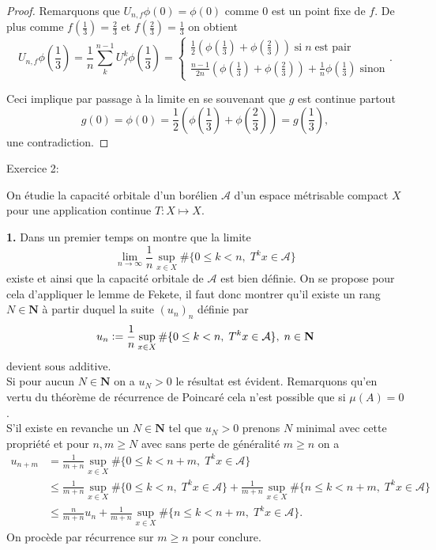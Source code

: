 \documentclass[12pt]{article}
\newcommand{\defeq}{\vcentcolon=}
\newenvironment{statement}[1]
{\begin{mdframed}[linewidth=0.6pt]
        Exercice \textsc{#1:}

}
    {\end{mdframed}}
\newcommand{\N}{\mathbf{N}}
\begin{document}
\begin{proof}
Remarquons que $U_{n,f}\phi(0) = \phi(0)$ comme 0 est un point fixe de $f$. De plus comme $f(\frac{1}{3}) = \frac{2}{3}$ et $f(\frac{2}{3}) = \frac{1}{3}$ on obtient \[
        U_{n, f}\phi(\frac{1}{3}) = \frac{1}{n}\sum_{k}^{n-1}U_{f}^{k}\phi(\frac{1}{3}) = \begin{cases}
                \frac{1}{2}(\phi(\frac{1}{3})+\phi(\frac{2}{3})) \; \text{si} \; n \; \text{est pair} \\
                \frac{n-1}{2n}(\phi(\frac{1}{3})+\phi(\frac{2}{3})) + \frac{1}{n}\phi(\frac{1}{3}) \; \text{sinon}
        \end{cases}
.\]  

Ceci implique par passage à la limite en se souvenant que $g$ est continue partout \[
        g(0) = \phi(0) = \frac{1}{2}(\phi(\frac{1}{3})+\phi(\frac{2}{3})) = g(\frac{1}{3}) 
,\] une contradiction.  

\end{proof}

\newpage

\begin{statement}{2}
       On étudie la capacité orbitale d'un borélien $\mathcal{A}$ d'un espace métrisable compact $X$ pour une application continue $T : X \longmapsto X$.
\end{statement}

\textbf{1.} Dans un premier temps on montre que la limite \[
\lim_{n\to \infty}\frac{1}{n}\sup_{x\in X}\#\{0\le k < n, \; T^{k}x \in \mathcal{A}\} 
\] existe et ainsi que la capacité orbitale de $\mathcal{A}$ est bien définie. On se propose pour cela d'appliquer le lemme de Fekete, il faut donc montrer qu'il existe un rang $N \in \N$ à partir duquel la suite $(u_{n})_{n}$ définie par \[
u_{n} \defeq \frac{1}{n}\sup_{x\in X}\#\{0\le k < n, \; T^{k}x \in \mathcal{A}\}, \; n \in \N 
\] devient sous additive. \\

Si pour aucun $N \in \N$ on a $u_{N} > 0$ le résultat est évident. Remarquons qu'en vertu du théorème de récurrence de Poincaré cela n'est possible que si $\mu(A) = 0$. \\
S'il existe en revanche un $N \in \N$ tel que $u_{N} > 0$ prenons $N$ minimal avec cette propriété et pour $n, m \ge N$ avec sans perte de généralité $m \ge n$ on a
\begin{align*}
        u_{n+m} &= \frac{1}{m+n}\sup_{x\in X}\#\{0 \le k < n + m, \; T^{k}x \in \mathcal{A}\} \\
                &\le \frac{1}{m+n}\sup_{x\in X}\#\{0 \le k < n, \; T^{k}x \in \mathcal{A}\} + \frac{1}{m+n}\sup_{x\in X}\#\{n\le k < n+m, \; T^{k}x \in \mathcal{A}\} \\
                &\le \frac{n}{m+n}u_{n} + \frac{1}{m+n}\sup_{x\in X}\#\{n\le k < n+m, \; T^{k}x \in \mathcal{A}\}
.\end{align*}
On procède par récurrence sur $m \ge n$ pour conclure.
\end{document}
